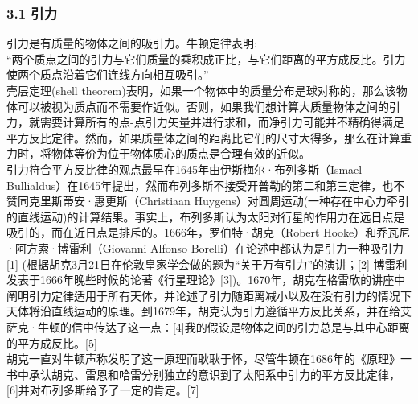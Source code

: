\subsubsection{3.1 引力}
引力是有质量的物体之间的吸引力。牛顿定律表明:\\

“两个质点之间的引力与它们质量的乘积成正比，与它们距离的平方成反比。引力使两个质点沿着它们连线方向相互吸引。”\\

壳层定理(shell theorem)表明，如果一个物体中的质量分布是球对称的，那么该物体可以被视为质点而不需要作近似。否则，如果我们想计算大质量物体之间的引力，就需要计算所有的点-点引力矢量并进行求和，而净引力可能并不精确得满足平方反比定律。然而，如果质量体之间的距离比它们的尺寸大得多，那么在计算重力时，将物体等价为位于物体质心的质点是合理有效的近似。\\

引力符合平方反比律的观点最早在1645年由伊斯梅尔·布列多斯（Ismael Bullialdus）在1645年提出，然而布列多斯不接受开普勒的第二和第三定律，也不赞同克里斯蒂安·惠更斯（Christiaan Huygens）对圆周运动(一种存在中心力牵引的直线运动)的计算结果。事实上，布列多斯认为太阳对行星的作用力在远日点是吸引的，而在近日点是排斥的。1666年，罗伯特·胡克（Robert Hooke）和乔瓦尼·阿方索·博雷利（Giovanni Alfonso Borelli）在论述中都认为是引力一种吸引力[1] (根据胡克3月21日在伦敦皇家学会做的题为“关于万有引力”的演讲；[2] 博雷利发表于1666年晚些时候的论著《行星理论》[3])。1670年，胡克在格雷欣的讲座中阐明引力定律适用于所有天体，并论述了引力随距离减小以及在没有引力的情况下天体将沿直线运动的原理。到1679年，胡克认为引力遵循平方反比关系，并在给艾萨克·牛顿的信中传达了这一点：[4]我的假设是物体之间的引力总是与其中心距离的平方成反比。[5]\\

胡克一直对牛顿声称发明了这一原理而耿耿于怀，尽管牛顿在1686年的《原理》一书中承认胡克、雷恩和哈雷分别独立的意识到了太阳系中引力的平方反比定律，[6]并对布列多斯给予了一定的肯定。[7]


